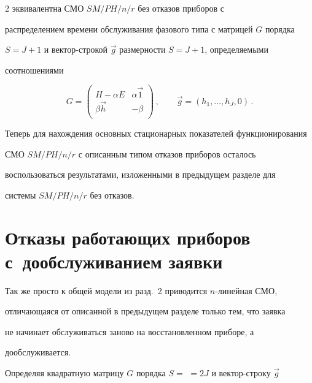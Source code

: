 \begin{multicols}{2}
эквивалентна СМО $SM/PH/n/r$ без отказов приборов с


распределением времени обслуживания фазового типа с матрицей $G$ порядка


$S=J+1$ и вектор-строкой $\vec g$ размерности $S=J+1$, определяемыми


соотношениями


$$


G=


\begin{pmatrix}


H-\alpha E       &  \alpha \vec1  \\


\beta \vec h     &  - \beta        \\


\end{pmatrix}\,,


\qquad


\vec g =


(h_1,\ldots, h_J,0)\,.


$$





Теперь для нахождения основных стационарных показателей функционирования


СМО $SM/PH/n/r$ с описанным типом отказов приборов осталось


воспользоваться результатами, изложенными в предыдущем разделе для


системы $SM/PH/n/r$ без отказов.





\section{Отказы работающих приборов с~дообслуживанием заявки}





Так же просто к общей модели из разд.~2 приводится $n$-линейная СМО,


отличающаяся от описанной в предыдущем разделе только тем, что заявка


не начинает обслуживаться заново на восстановленном приборе, а


дообслуживается.








Определяя квадратную матрицу $G$ порядка $S=$ $=2J$ и вектор-строку $\vec g$ 



\end{multicols}
